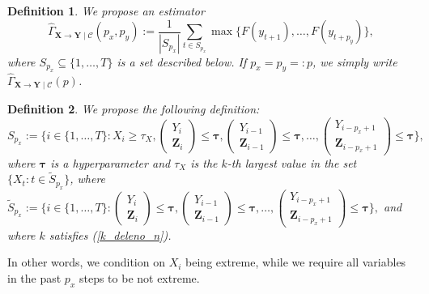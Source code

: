 \documentclass[a4paper,11pt]{article}
\newtheorem{definition}{Definition}
\begin{document}
\begin{definition}
  We propose an estimator
  \begin{equation*}
\hat{\Gamma}_{\textbf{X}\to\textbf{Y}\mid\mathcal{C}}(p_x, p_y):= \frac{1}{|S_{p_x}|}\sum_{t\in S_{p_x}} \max\{F(y_{t+1}),\dots, F(y_{t+p_y})\},
  \end{equation*}
 where $S_{p_x}\subseteq\{1, \dots, T\}$ is a set described below. If $p_x=p_y=:p$, we simply write $\hat{\Gamma}_{\textbf{X}\to\textbf{Y}\mid\mathcal{C}}(p)$.
\end{definition}

 \begin{definition}
We propose the following definition:  \begin{equation*}
      S_{p_x} := \{i\in\{1, \dots, T\}: X_i\geq \tau_X, 
      \begin{pmatrix}
    Y_i \\
    \textbf{Z}_i 
\end{pmatrix}   \leq  \boldsymbol{\tau},
 \begin{pmatrix}
    Y_{i-1} \\
    \textbf{Z}_{i-1} 
\end{pmatrix}   \leq  \boldsymbol{\tau}, 
\dots, 
 \begin{pmatrix}
    Y_{i-p_x+1} \\
    \textbf{Z}_{i-p_x+1} 
\end{pmatrix}   \leq  \boldsymbol{\tau} \},
  \end{equation*}
where $\boldsymbol{\tau}$ is a hyperparameter and  $\tau_X$ is the $k$-th largest value in the set $\{X_t: t\in\tilde{S}_{p_x} \}$, where
$
      \tilde{S}_{p_x} := \{i\in\{1, \dots, T\}: 
      \begin{pmatrix}
    Y_i \\
    \textbf{Z}_i 
\end{pmatrix}   \leq  \boldsymbol{\tau},
 \begin{pmatrix}
    Y_{i-1} \\
    \textbf{Z}_{i-1} 
\end{pmatrix}   \leq  \boldsymbol{\tau}, 
\dots, 
 \begin{pmatrix}
    Y_{i-p_x+1} \\
    \textbf{Z}_{i-p_x+1} 
\end{pmatrix}   \leq  \boldsymbol{\tau} \},
$ and where $k$ satisfies (\ref{k_deleno_n}). 
\end{definition}
In other words, we condition on $X_i$ being extreme, while we require all variables in the past $p_x$ steps to be not extreme. 
\end{document}
